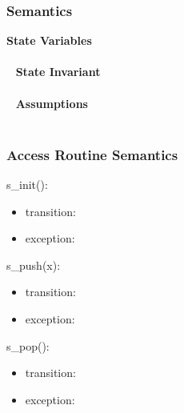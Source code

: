 \documentclass[t,12pt,numbers,fleqn,handout]{beamer}
\begin{document}
\begin{frame}
\frametitle{Semantics}

\textbf{State Variables}\\
~\newline
{}\\
~\newline
\textbf{State Invariant}\\
~\newline
{}\\
~\newline
\textbf{Assumptions}\\
~\newline
{}\\

\end{frame}


\begin{frame}
\frametitle{Access Routine Semantics}

s\_init():
\begin{itemize}
\item transition: 
\item exception: 
\end{itemize}

\noindent s\_push(x):
\begin{itemize}
\item transition: 
\item exception: 
\end{itemize}

\noindent s\_pop():
\begin{itemize}
\item transition: 
\item exception: 
\end{itemize}

\end{frame}

\end{document}
